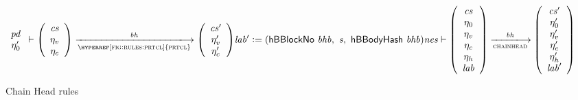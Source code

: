 \begin{figure}[ht]
\begin{equation}
{      {
        {\begin{array}{c}
            \var{pd} \\
            \eta_0' \\
         \end{array}}
        \vdash
        {\left(\begin{array}{c}
              \var{cs} \\
              \eta_v \\
              \eta_c \\
        \end{array}\right)}
        \trans{\hyperref[fig:rules:prtcl]{prtcl}}{\var{bh}}
        {\left(\begin{array}{c}
              \var{cs'} \\
              \eta_v' \\
              \eta_c' \\
        \end{array}\right)}
      } \\~\\~\\
      \var{lab'}\leteq (\hBBlockNo{bhb},~\var{s},~\hBBodyHash{bhb} ) \\
    }
    {
      \var{nes}
      \vdash
      {\left(\begin{array}{c}
            \var{cs} \\
            \eta_0 \\
            \eta_v \\
            \eta_c \\
            \eta_h \\
            \var{lab} \\
      \end{array}\right)}
      \trans{chainhead}{\var{bh}}
      {\left(\begin{array}{c}
            \var{cs}' \\
            \eta_0' \\
            \eta_v' \\
            \eta_c' \\
            \eta_h' \\
            \var{lab}' \\
      \end{array}\right)}
    }
  \end{equation}
  \caption{Chain Head rules}
  \label{fig:rules:chainhead}
\end{figure}

